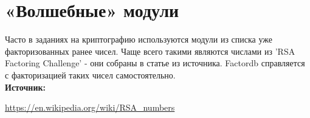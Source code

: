\documentclass[12pt,a4paper]{scrartcl}
\begin{document}
\section{«Волшебные» модули}

Часто в заданиях на криптографию используются модули из списка уже факторизованных ранее чисел. Чаще всего такими являются числами из 'RSA Factoring Challenge' - они собраны в статье из источника. Factordb справляется с факторизацией таких чисел самостоятельно.\\

\textbf{Источник:}

\href{https://en.wikipedia.org/wiki/RSA_numbers}{https://en.wikipedia.org/wiki/RSA\_numbers}
\end{document}
